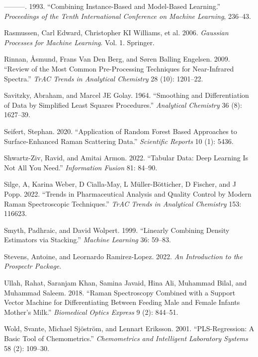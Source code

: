 \documentclass[
  letterpaper,
  DIV=11,
  numbers=noendperiod]{scrartcl}
\newlength{\cslhangindent}
\newlength{\cslentryspacingunit} %
\newenvironment{CSLReferences}[2] %
 {%
  \setlength{\parindent}{0pt}
  \ifodd #1
  \let\oldpar\par
  \def\par{\hangindent=\cslhangindent\oldpar}
  \fi
  \setlength{\parskip}{#2\cslentryspacingunit}
 }%
 {}
\begin{document}
\begin{CSLReferences}{1}{0}
\leavevmode{}%
---------. 1993. {``Combining Instance-Based and Model-Based
Learning.''} \emph{Proceedings of the Tenth International Conference on
Machine Learning}, 236--43.

\leavevmode{}%
Rasmussen, Carl Edward, Christopher KI Williams, et al. 2006.
\emph{Gaussian Processes for Machine Learning}. Vol. 1. Springer.

\leavevmode{}%
Rinnan, Åsmund, Frans Van Den Berg, and Søren Balling Engelsen. 2009.
{``Review of the Most Common Pre-Processing Techniques for Near-Infrared
Spectra.''} \emph{TrAC Trends in Analytical Chemistry} 28 (10):
1201--22.

\leavevmode{}%
Savitzky, Abraham, and Marcel JE Golay. 1964. {``Smoothing and
Differentiation of Data by Simplified Least Squares Procedures.''}
\emph{Analytical Chemistry} 36 (8): 1627--39.

\leavevmode{}%
Seifert, Stephan. 2020. {``Application of Random Forest Based Approaches
to Surface-Enhanced Raman Scattering Data.''} \emph{Scientific Reports}
10 (1): 5436.

\leavevmode{}%
Shwartz-Ziv, Ravid, and Amitai Armon. 2022. {``Tabular Data: Deep
Learning Is Not All You Need.''} \emph{Information Fusion} 81: 84--90.

\leavevmode{}%
Silge, A, Karina Weber, D Cialla-May, L Müller-Bötticher, D Fischer, and
J Popp. 2022. {``Trends in Pharmaceutical Analysis and Quality Control
by Modern Raman Spectroscopic Techniques.''} \emph{TrAC Trends in
Analytical Chemistry} 153: 116623.

\leavevmode{}%
Smyth, Padhraic, and David Wolpert. 1999. {``Linearly Combining Density
Estimators via Stacking.''} \emph{Machine Learning} 36: 59--83.

\leavevmode{}%
Stevens, Antoine, and Leornardo Ramirez-Lopez. 2022. \emph{An
Introduction to the Prospectr Package}.

\leavevmode{}%
Ullah, Rahat, Saranjam Khan, Samina Javaid, Hina Ali, Muhammad Bilal,
and Muhammad Saleem. 2018. {``Raman Spectroscopy Combined with a Support
Vector Machine for Differentiating Between Feeding Male and Female
Infants Mother's Milk.''} \emph{Biomedical Optics Express} 9 (2):
844--51.

\leavevmode{}%
Wold, Svante, Michael Sjöström, and Lennart Eriksson. 2001.
{``PLS-Regression: A Basic Tool of Chemometrics.''} \emph{Chemometrics
and Intelligent Laboratory Systems} 58 (2): 109--30.

\end{CSLReferences}
\end{document}
